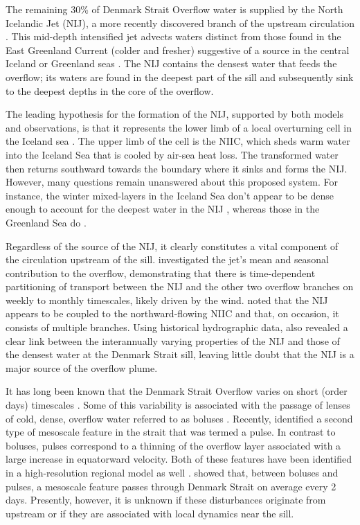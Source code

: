\documentclass[12pt,titlepage,figuresatend]{article}
\begin{document}
The remaining 30\% of Denmark Strait Overflow water is supplied by the North Icelandic Jet (NIJ), a more recently discovered branch of the upstream circulation \cite[]{Steingrimur2004,Vage2011}. This mid-depth intensified jet advects waters distinct from those found in the East Greenland Current (colder and fresher) suggestive of a source in the central Iceland or Greenland seas \cite[]{Vage2011,Vage2015,Harden2016}. The NIJ contains the densest water that feeds the overflow; its waters are found in the deepest part of the sill \cite[]{Mastropole2017} and subsequently sink to the deepest depths in the core of the overflow.

The leading hypothesis for the formation of the NIJ, supported by both models and observations, is that it represents the lower limb of a local overturning cell in the Iceland sea \cite[]{Vage2011,Behrens2017}. The upper limb of the cell is the NIIC, which sheds warm water into the Iceland Sea that is cooled by air-sea heat loss. The transformed water then returns southward towards the boundary where it sinks and forms the NIJ. However, many questions remain unanswered about this proposed system. For instance, the winter mixed-layers in the Iceland Sea don't appear to be dense enough to account for the deepest water in the NIJ \cite[]{Vage2015}, whereas those in the Greenland Sea do \cite[]{Strass1993,Rudels2002}.

Regardless of the source of the NIJ, it clearly constitutes a vital component of the circulation upstream of the sill. \cite{Harden2016} investigated the jet's mean and seasonal contribution to the overflow, demonstrating that there is time-dependent partitioning of transport between the NIJ and the other two overflow branches on weekly to monthly timescales, likely driven by the wind. \cite{Pickart2017} noted that the NIJ appears to be coupled to the northward-flowing NIIC and that, on occasion, it consists of multiple branches. Using historical hydrographic data, \cite{Pickart2017} also revealed a clear link between the interannually varying properties of the NIJ and those of the densest water at the Denmark Strait sill, leaving little doubt that the NIJ is a major source of the overflow plume. 

It has long been known that the Denmark Strait Overflow varies on short (order days) timescales \cite[]{Smith1976,Bruce1995,Kase2003}. Some of this variability is associated with the passage of lenses of cold, dense, overflow water referred to as boluses \cite[]{Cooper1955}. Recently, \cite{Appen2017} identified a second type of mesoscale feature in the strait that was termed a pulse. In contrast to boluses, pulses correspond to a thinning of the overflow layer associated with a large increase in equatorward velocity. Both of these features have been identified in a high-resolution regional model as well \cite[]{Almansi2017}. \cite{Appen2017} showed that, between boluses and pulses, a mesoscale feature passes through Denmark Strait on average every 2 days. Presently, however, it is unknown if these disturbances originate from upstream or if they are associated with local dynamics near the sill. 
\end{document}
